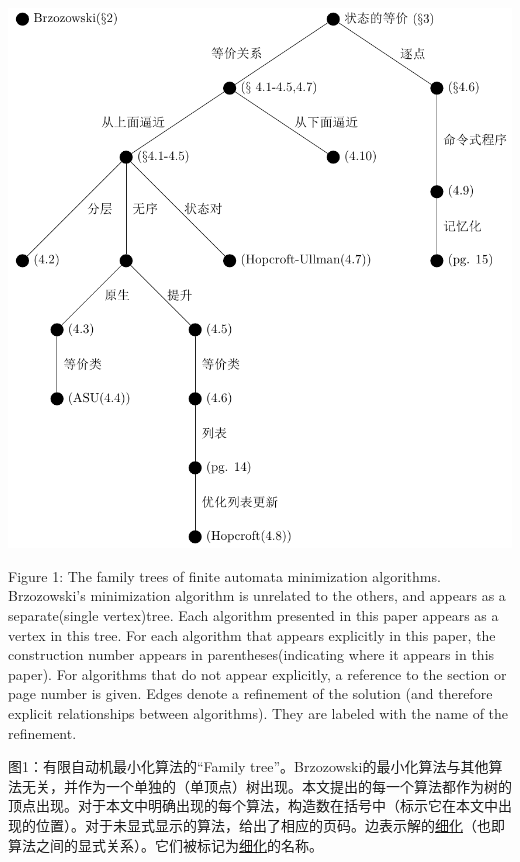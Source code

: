 \includegraphics[width =.93\textwidth]{figure1.pdf}

Figure 1: The family trees of finite automata minimization algorithms. Brzozowski's minimization algorithm is unrelated to the others, and appears as a separate(single vertex)tree. Each algorithm presented in this paper appears as a vertex in this tree. For each algorithm that appears explicitly in this paper, the construction number appears in parentheses(indicating where it appears in this paper). For algorithms that do not appear explicitly, a reference to the section or page number is given. Edges denote a refinement of the solution (and therefore explicit relationships between algorithms). They are labeled with the name of the refinement.

图1：有限自动机最小化算法的“Family tree”。Brzozowski的最小化算法与其他算法无关，并作为一个单独的（单顶点）树出现。本文提出的每一个算法都作为树的顶点出现。对于本文中明确出现的每个算法，构造数在括号中（标示它在本文中出现的位置）。对于未显式显示的算法，给出了相应的页码。边表示解的\uline{细化}（也即算法之间的显式关系）。它们被标记为\uline{细化}的名称。

